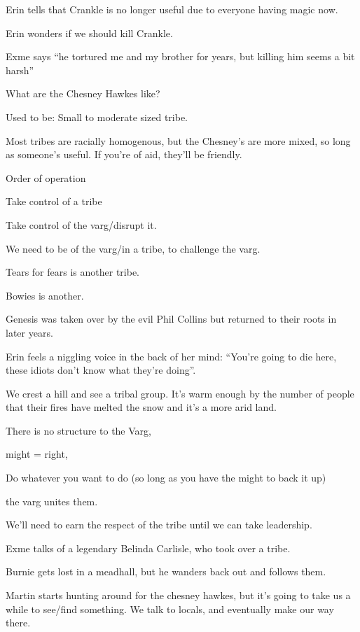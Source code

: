 Erin tells that Crankle is no longer useful due to everyone having magic now.\medskip

Erin wonders if we should kill Crankle.\medskip

Exme says “he tortured me and my brother for years, but killing him seems a bit harsh”\medskip

What are the Chesney Hawkes like?\medskip

Used to be: Small to moderate sized tribe.\medskip

Most tribes are racially homogenous, but the Chesney’s are more mixed, so long as someone’s useful. If you’re of aid, they’ll be friendly.\medskip

Order of operation\medskip

Take control of a tribe\medskip

Take control of the varg/disrupt it.\medskip

We need to be of the varg/in a tribe, to challenge the varg.\medskip

Tears for fears is another tribe.\medskip

Bowies is another.\medskip

Genesis was taken over by the evil Phil Collins but returned to their roots in later years.\medskip

Erin feels a niggling voice in the back of her mind: “You’re going to die here, these idiots don’t know what they’re doing”.\medskip

We crest a hill and see a tribal group. It’s warm enough by the number of people that their fires have melted the snow and it’s a more arid land.\medskip

There is no structure to the Varg,\medskip

might = right,\medskip

Do whatever you want to do (so long as you have the might to back it up)\medskip

the varg unites them.\medskip

We’ll need to earn the respect of the tribe until we can take leadership.\medskip

Exme talks of a legendary Belinda Carlisle, who took over a tribe.\medskip

Burnie gets lost in a meadhall, but he wanders back out and follows them.\medskip

Martin starts hunting around for the chesney hawkes, but it’s going to take us a while to see/find something. We talk to locals, and eventually make our way there.\medskip

